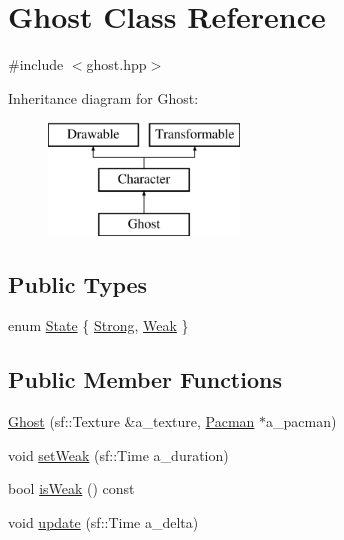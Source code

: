 \hypertarget{class_ghost}{}\section{Ghost Class Reference}
\label{class_ghost}


{\ttfamily \#include $<$ghost.\+hpp$>$}

Inheritance diagram for Ghost\+:\begin{figure}[H]
\begin{center}
\leavevmode
\includegraphics[height=3.000000cm]{class_ghost}
\end{center}
\end{figure}
\subsection*{Public Types}
\begin{DoxyCompactItemize}
\item 
enum \hyperlink{class_ghost_af712fc09f900832a0225928c4556234d}{State} \{ \hyperlink{class_ghost_af712fc09f900832a0225928c4556234dacfaab1cebc10dc849b5e740dad4eb7f0}{Strong}, 
\hyperlink{class_ghost_af712fc09f900832a0225928c4556234da2728b733f9f5d557a05e6fa1aaaf174a}{Weak}
 \}
\end{DoxyCompactItemize}
\subsection*{Public Member Functions}
\begin{DoxyCompactItemize}
\item 
\hyperlink{class_ghost_a931627708b35e6f0b6f9d106adbaee1f}{Ghost} (sf\+::\+Texture \&a\+\_\+texture, \hyperlink{class_pacman}{Pacman} $\ast$a\+\_\+pacman)
\item 
void \hyperlink{class_ghost_ad3af3a46b5c130515dffaae54824341a}{set\+Weak} (sf\+::\+Time a\+\_\+duration)
\item 
bool \hyperlink{class_ghost_af0cf8b5a66a4a390746f43238b96fe55}{is\+Weak} () const
\item 
void \hyperlink{class_ghost_a164e0607f7ea0d72d756bdf964e66b90}{update} (sf\+::\+Time a\+\_\+delta)
\end{DoxyCompactItemize}
